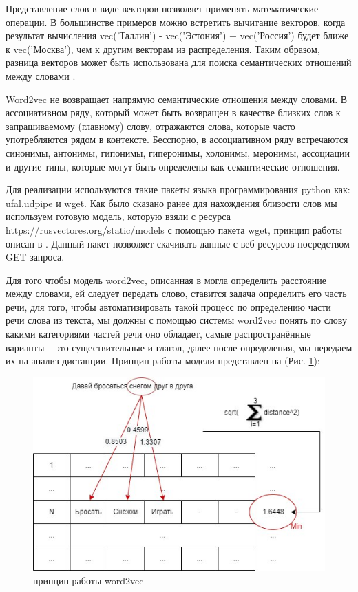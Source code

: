 Представление слов в виде векторов позволяет применять математические операции. В большинстве примеров можно встретить вычитание векторов, 
когда результат вычисления vec('Таллин') - vec('Эстония') + vec('Россия') будет ближе к vec('Москва'), чем к другим векторам из распределения. 
Таким образом, разница векторов может быть использована для поиска семантических отношений между словами \cite{seman02}.

Word2vec не возвращает напрямую семантические отношения между словами. В ассоциативном ряду, который может быть возвращен 
в качестве близких слов к запрашиваемому (главному) слову, отражаются слова, которые часто употребляются рядом в контексте. 
Бесспорно, в ассоциативном ряду встречаются синонимы, антонимы, гипонимы, гиперонимы, холонимы, меронимы, ассоциации и другие 
типы, которые могут быть определены как семантические отношения.


Для реализации используются такие пакеты языка программирования python как: ufal.udpipe и wget. 
Как было сказано ранее для нахождения близости слов мы используем готовую модель, которую взяли с ресурса 
https://rusvectores.org/static/models с помощью пакета wget, принцип работы описан в \cite{neural08}. Данный пакет позволяет скачивать данные 
с веб ресурсов посредством GET запроса.

Для того чтобы модель word2vec, описанная в \cite{w2vec02} могла определить расстояние между словами, ей следует передать слово, ставится задача определить 
его часть речи, для того, чтобы автоматизировать такой процесс по определению части речи слова из текста, мы должны с помощью 
системы word2vec понять по слову какими категориями частей речи оно обладает, самые распространённые варианты – это 
существительные и глагол, далее после определения,  мы передаем их на анализ дистанции. 
Принцип работы модели представлен на (Рис. \ref{pic:ris15}):

\begin{figure}[H]
\includegraphics[width=0.75\columnwidth]{./img/ris15.png}
\centering
\caption{принцип работы word2vec}
\label{pic:ris15}
\end{figure}

